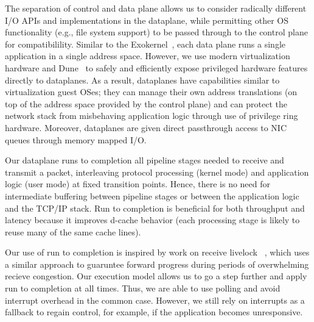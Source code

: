The separation of control and data plane allows us to consider radically
different I/O APIs and implementations in the dataplane, while
permitting other OS functionality (e.g., file system
support) to be passed through to the control plane for compatibilility.
Similar to the
Exokernel~\cite{DBLP:conf/sosp/EnglerKO95}, each data plane runs a
single application in a single address space. However,
we use modern virtualization hardware and Dune~\cite{dune} to
safely and efficiently expose privileged hardware features directly to
dataplanes. As a result, dataplanes have capabilities similar to
virtualization guest OSes; they can manage
their own address translations (on top of the address space provided by
the control plane) and can protect the network stack from misbehaving
application logic through use of privilege ring hardware. Moreover,
dataplanes are given direct passthrough access to NIC queues through
memory mapped I/O.



 Our dataplane
runs to completion all pipeline stages needed to receive and transmit a
packet, interleaving protocol processing (kernel mode) and application
logic (user mode) at fixed transition points. Hence, there is no need for intermediate
buffering between pipeline stages or between the application logic and
the TCP/IP stack. Run to completion is beneficial for both throughput
and latency because it improves d-cache behavior (each processing stage
is likely to reuse many of the same cache lines).

Our use of run to completion is inspired by work on receive livelock
~\cite{receive-livelock}, which uses a similar approach
to guaruntee forward progress during periods of overwhelming recieve congestion.
Our execution model allows us to go a step further and apply run to completion
at all times. Thus, we are able to use polling and avoid interrupt overhead
in the common case. However, we still rely on interrupts as a fallback to regain control,
for example, if the application becomes unresponsive.

